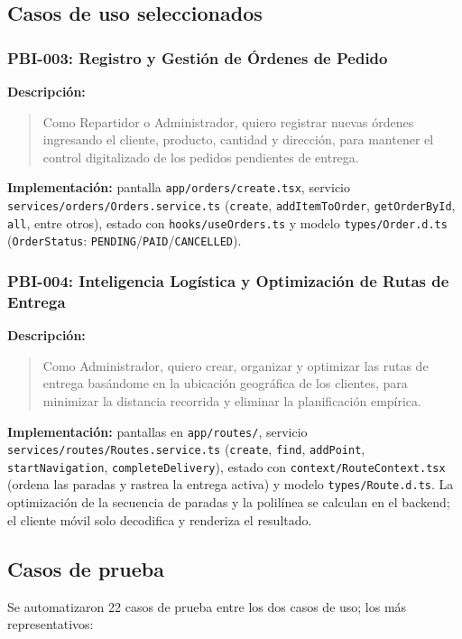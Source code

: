 \documentclass[11pt,a4paper]{article}
\newcommand{\campopar}[2]{\par\noindent\textbf{#1:}\par\begin{quote}\noindent #2\end{quote}}
\begin{document}
\subsection{Casos de uso seleccionados}

\subsubsection{PBI-003: Registro y Gestión de Órdenes de Pedido}

\campopar{Descripción}{Como Repartidor o Administrador, quiero registrar nuevas órdenes
ingresando el cliente, producto, cantidad y dirección, para mantener el control digitalizado
de los pedidos pendientes de entrega.}

\textbf{Implementación:} pantalla \texttt{app/orders/create.tsx}, servicio
\texttt{services/orders/Orders.service.ts} (\texttt{create}, \texttt{addItemToOrder},
\texttt{getOrderById}, \texttt{all}, entre otros), estado con \texttt{hooks/useOrders.ts} y
modelo \texttt{types/Order.d.ts} (\texttt{OrderStatus}: \texttt{PENDING}/\texttt{PAID}/\texttt{CANCELLED}).

\subsubsection{PBI-004: Inteligencia Logística y Optimización de Rutas de Entrega}

\campopar{Descripción}{Como Administrador, quiero crear, organizar y optimizar las rutas de
entrega basándome en la ubicación geográfica de los clientes, para minimizar la distancia
recorrida y eliminar la planificación empírica.}

\textbf{Implementación:} pantallas en \texttt{app/routes/}, servicio
\texttt{services/routes/Routes.service.ts} (\texttt{create}, \texttt{find},
\texttt{addPoint}, \texttt{startNavigation}, \texttt{completeDelivery}), estado con
\texttt{context/RouteContext.tsx} (ordena las paradas y rastrea la entrega activa) y modelo
\texttt{types/Route.d.ts}. La optimización de la secuencia de paradas y la polilínea se
calculan en el backend; el cliente móvil solo decodifica y renderiza el resultado.

\subsection{Casos de prueba}
\label{sec:casos-prueba}

Se automatizaron 22 casos de prueba entre los dos casos de uso; los más representativos:
\end{document}
